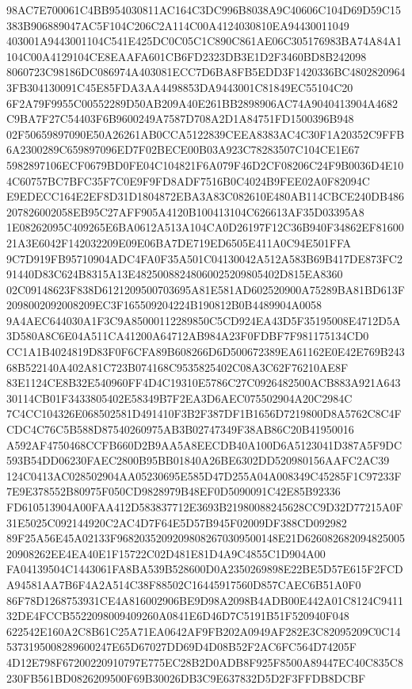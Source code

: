 \documentclass[UTF8,fontset=fandol,zihao=-4,a4paper]{ctexart}
\begin{document}
{{98AC7E700061C4BB954030811AC164C3DC996B8038A9C40606C104D69D59C15383B906889047AC5F104C206C2A114C00A4124030810EA94430011049
403001A9443001104C541E425DC0C05C1C890C861AE06C305176983BA74A84A1104C00A4129104CE8EAAFA601CB6FD2323DB3E1D2F3460BD8B242098
8060723C98186DC086974A403081ECC7D6BA8FB5EDD3F1420336BC48028209643FB304130091C45E85FDA3AA4498853DA9443001C81849EC55104C20
6F2A79F9955C00552289D50AB209A40E261BB2898906AC74A9040413904A4682C9BA7F27C54403F6B9600249A7587D708A2D1A84751FD1500396B948
02F50659897090E50A26261AB0CCA5122839CEEA8383AC4C30F1A20352C9FFB6A2300289C659897096ED7F02BECE00B03A923C78283507C104CE1E67
5982897106ECF0679BD0FE04C104821F6A079F46D2CF08206C24F9B0036D4E104C60757BC7BFC35F7C0E9F9FD8ADF7516B0C4024B9FEE02A0F82094C
E9EDECC164E2EF8D31D1804872EBA3A83C082610E480AB114CBCE240DB486207826002058EB95C27AFF905A4120B100413104C626613AF35D03395A8
1E08262095C409265E6BA0612A513A104CA0D26197F12C36B940F34862EF8160021A3E6042F142032209E09E06BA7DE719ED6505E411A0C94E501FFA
9C7D919FB95710904ADC4FA0F35A501C04130042A512A583B69B417DE873FC291440D83C624B8315A13E48250088248060025209805402D815EA8360
02C09148623F838D6121209500703695A81E581AD602520900A75289BA81BD613F2098002092008209EC3F165509204224B190812B0B4489904A0058
9A4AEC644030A1F3C9A85000112289850C5CD924EA43D5F35195008E4712D5A3D580A8C6E04A511CA41200A64712AB984A23F0FDBF7F981175134CD0
CC1A1B4024819D83F0F6CFA89B608266D6D500672389EA61162E0E42E769B24368B522140A402A81C723B074168C9535825402C08A3C62F76210AE8F
83E1124CE8B32E540960FF4D4C19310E5786C27C0926482500ACB883A921A64330114CB01F3433805402E58349B7F2EA3D6AEC075502904A20C2984C
7C4CC104326E068502581D491410F3B2F387DF1B1656D7219800D8A5762C8C4FCDC4C76C5B588D87540260975AB3B02747349F38AB86C20B41950016
A592AF4750468CCFB660D2B9AA5A8EECDB40A100D6A5123041D387A5F9DC593B54DD06230FAEC2800B95BB01840A26BE6302DD520980156AAFC2AC39
124C0413AC028502904AA05230695E585D47D255A04A008349C45285F1C97233F7E9E378552B80975F050CD9828979B48EF0D5090091C42E85B92336
FD610513904A00FAA412D583837712E3693B21980088245628CC9D32D77215A0F31E5025C092144920C2AC4D7F64E5D57B945F02009DF388CD092982
89F25A56E45A02133F96820352092098082670309500148E21D62608268209482500520908262EE4EA40E1F15722C02D481E81D4A9C4855C1D904A00
FA04139504C1443061FA8BA539B528600D0A2350269898E22BE5D57E615F2FCDA94581AA7B6F4A2A514C38F88502C16445917560D857CAEC6B51A0F0
86F78D1268753931CE4A816002906BE9D98A2098B4ADB00E442A01C8124C941132DE4FCCB5522098009409260A0841E6D46D7C5191B51F520940F048
622542E160A2C8B61C25A71EA0642AF9FB202A0949AF282E3C82095209C0C145373195008289600247E65D67027DD69D4D08B52F2AC6FC564D74205F
4D12E798F67200220910797E775EC28B2D0ADB8F925F8500A89447EC40C835C8230FB561BD0826209500F69B30026DB3C9E637832D5D2F3FFDB8DCBF
}}
\end{document}
